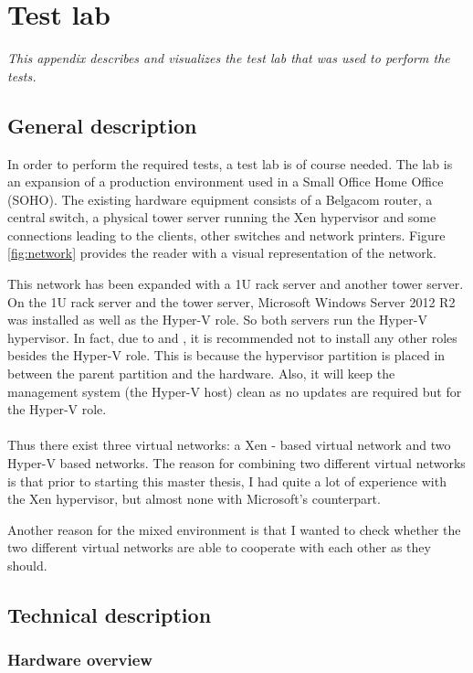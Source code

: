 \chapter{Test lab}
\label{app:network}
\emph{This appendix describes and visualizes the test lab that was used to perform the tests.}

\section{General description}

In order to perform the required tests, a test lab is of course needed. The lab is an expansion of a production environment used in a Small Office Home Office (SOHO). The existing hardware equipment consists of a Belgacom router, a central switch, a physical tower server running the Xen hypervisor and some connections leading to the clients, other switches and network printers. Figure \ref{fig:network} provides the reader with a visual representation of the network.

This network has been expanded with a 1U rack server and another tower server. On the 1U rack server and the tower server, Microsoft Windows Server 2012 R2 was installed as well as the Hyper-V role. So both servers run the Hyper-V hypervisor. In fact, due to \citep{Best1} and \citep{Best2}, it is recommended not to install any other roles besides the Hyper-V role. This is because the hypervisor partition is placed in between the parent partition and the hardware. Also, it will keep the management system (the Hyper-V host) clean as no updates are required but for the Hyper-V role.\\ \\
Thus there exist three virtual networks: a Xen - based virtual network and two Hyper-V based networks. The reason for combining two different virtual networks is that prior to starting this master thesis, I had quite a lot of experience with the Xen hypervisor, but almost none with Microsoft's counterpart.

Another reason for the mixed environment is that I wanted to check whether the two different virtual networks are able to cooperate with each other as they should.

\section{Technical description}

\subsection{Hardware overview}

